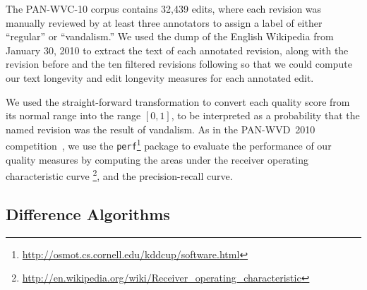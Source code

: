 The PAN-WVC-10 corpus contains 32,439 edits, where each revision was
manually reviewed by at least three annotators to assign a label
of either ``regular'' or ``vandalism.''
We used the dump of the English Wikipedia from January 30, 2010
to extract the text of each annotated revision, along with the revision
before and the ten filtered revisions following so that we could compute
our text longevity and edit longevity measures for each annotated edit.

We used the straight-forward transformation to convert
each quality score from its normal range into the range
$[0,1]$, to be interpreted as a probability that the named
revision was the result of vandalism.
As in the PAN-WVD~2010 competition~\cite{Potthast2010b}, we use the
\texttt{perf}\footnote{\url{http://osmot.cs.cornell.edu/kddcup/software.html}}
package to evaluate the performance of our quality measures
by computing the areas under the receiver operating characteristic
curve \footnote{\url{http://en.wikipedia.org/wiki/Receiver_operating_characteristic}},
and the precision-recall curve.

\subsection{Difference Algorithms}

